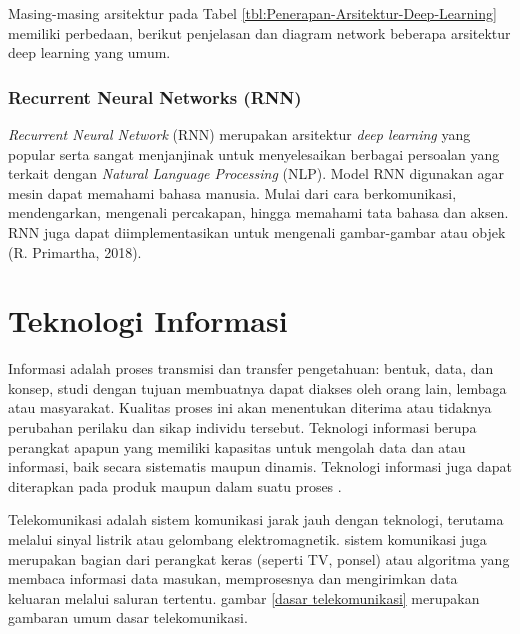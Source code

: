 Masing-masing arsitektur pada Tabel \ref{tbl:Penerapan-Arsitektur-Deep-Learning} memiliki perbedaan, berikut penjelasan dan diagram network beberapa arsitektur deep learning yang umum.

\subsubsection{Recurrent Neural Networks (RNN)}
\hspace{1,2cm}\textit{Recurrent Neural Network} (RNN) merupakan arsitektur \textit{deep learning} yang popular serta sangat menjanjinak untuk menyelesaikan berbagai persoalan yang terkait dengan \textit{Natural Language Processing} (NLP). Model RNN digunakan agar mesin dapat memahami bahasa manusia. Mulai dari cara berkomunikasi, mendengarkan, mengenali percakapan, hingga memahami tata bahasa dan aksen. RNN juga dapat diimplementasikan untuk mengenali gambar-gambar atau objek (R. Primartha, 2018).
	
\section{Teknologi Informasi}
\hspace{1,2cm}Informasi adalah proses transmisi dan transfer pengetahuan: bentuk, data, dan konsep, studi dengan tujuan membuatnya dapat diakses oleh orang lain, lembaga atau masyarakat. Kualitas proses ini akan menentukan diterima atau tidaknya perubahan perilaku dan sikap individu tersebut. Teknologi informasi berupa perangkat apapun yang memiliki kapasitas untuk mengolah data dan atau informasi, baik secara sistematis maupun dinamis. Teknologi informasi juga dapat diterapkan pada produk maupun dalam suatu proses \citep{Victoria2020}.

Telekomunikasi adalah sistem komunikasi jarak jauh dengan teknologi, terutama melalui sinyal listrik atau gelombang elektromagnetik. sistem komunikasi juga merupakan bagian dari perangkat keras (seperti TV, ponsel) atau algoritma yang membaca informasi data masukan, memprosesnya dan mengirimkan data keluaran melalui saluran tertentu. gambar \ref{dasar telekomunikasi} merupakan gambaran umum dasar telekomunikasi.

